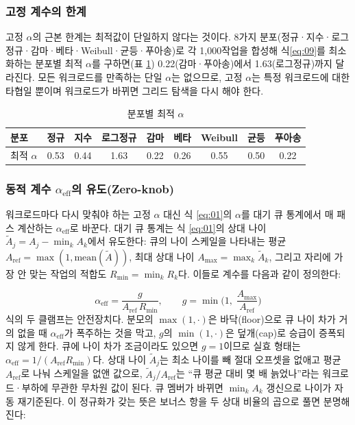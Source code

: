 \documentclass{ieeetj}
\begin{document}
\subsubsection{고정 계수의 한계}\label{coeff:limit}
고정 $\alpha$의 근본 한계는 최적값이 단일하지 않다는 것이다. 8가지 분포(정규·지수·로그정규·감마·베타·Weibull·균등·푸아송)로 각 1,000작업을 합성해 식\eqref{eq:09}를 최소화하는 분포별 최적 $\alpha$를 구하면(표 \ref{fig:motivation}) 0.22(감마·푸아송)에서 1.63(로그정규)까지 달라진다. 모든 워크로드를 만족하는 단일 $\alpha$는 없으므로, 고정 $\alpha$는 특정 워크로드에 대한 타협일 뿐이며 워크로드가 바뀌면 그리드 탐색을 다시 해야 한다.

\begin{table}[htb!]
\centering
\caption{분포별 최적 $\alpha$}
\label{fig:motivation}
\footnotesize
\setlength{\tabcolsep}{4pt}
\begin{tabular}{@{}l*{8}{c}@{}}
\toprule
분포 & 정규 & 지수 & 로그정규 & 감마 & 베타 & Weibull & 균등 & 푸아송 \\
\midrule
최적 $\alpha$ & 0.53 & 0.44 & 1.63 & 0.22 & 0.26 & 0.55 & 0.50 & 0.22 \\
\bottomrule
\end{tabular}
\end{table}

\subsubsection{동적 계수 $\alpha_{\text{eff}}$의 유도(Zero-knob)}\label{SAFA}
워크로드마다 다시 맞춰야 하는 고정 $\alpha$ 대신 식 \eqref{eq:01}의 $\alpha$를 대기 큐 통계에서 매 패스 계산하는 $\alpha_{\text{eff}}$로 바꾼다. 대기 큐 통계는 식 \eqref{eq:01}의 상대 나이 $\tilde A_j = A_j - \min_k A_k$에서 유도한다: 큐의 나이 스케일을 나타내는 평균 $A_{\text{ref}} = \max(1,\text{mean}(\tilde A))$, 최대 상대 나이 $A_{\max}=\max_k \tilde A_k$, 그리고 자리에 가장 안 맞는 작업의 적합도 $R_{\min}=\min_k R_k$다. 이들로 계수를 다음과 같이 정의한다:

\begin{equation}
\alpha_{\text{eff}} = \frac{g}{A_{\text{ref}}\,R_{\min}},\qquad g=\min\!\Big(1,\;\frac{A_{\max}}{A_{\text{ref}}}\Big)
\label{eq:auto-alpha}
\end{equation}
식의 두 클램프는 안전장치다. 분모의 $\max(1,\cdot)$은 바닥(floor)으로 큐 나이 차가 거의 없을 때 $\alpha_{\text{eff}}$가 폭주하는 것을 막고, $g$의 $\min(1,\cdot)$은 덮개(cap)로 승급이 증폭되지 않게 한다. 큐에 나이 차가 조금이라도 있으면 $g=1$이므로 실효 형태는 $\alpha_{\text{eff}}=1/(A_{\text{ref}}R_{\min})$다. 상대 나이 $\tilde A_j$는 최소 나이를 빼 절대 오프셋을 없애고 평균 $A_{\text{ref}}$로 나눠 스케일을 없앤 값으로, $\tilde A_j/A_{\text{ref}}$는 ``큐 평균 대비 몇 배 늙었나''라는 워크로드·부하에 무관한 무차원 값이 된다. 큐 멤버가 바뀌면 $\min_k A_k$ 갱신으로 나이가 자동 재기준된다. 이 정규화가 갖는 뜻은 보너스 항을 두 상대 비율의 곱으로 풀면 분명해진다:
\end{document}
